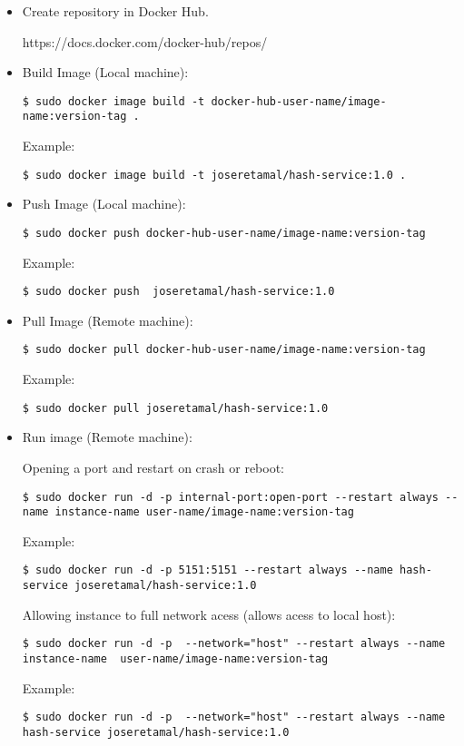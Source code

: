 \begin{itemize}
\item  Create repository in Docker Hub.

https://docs.docker.com/docker-hub/repos/
\item  Build Image (Local machine):
	
\begin{verbatim}
$ sudo docker image build -t docker-hub-user-name/image-name:version-tag .  
\end{verbatim}
Example:
\begin{verbatim}
$ sudo docker image build -t joseretamal/hash-service:1.0 . 
\end{verbatim}

\item  Push Image (Local machine):

\begin{verbatim}
$ sudo docker push docker-hub-user-name/image-name:version-tag
\end{verbatim}

Example:
\begin{verbatim}
$ sudo docker push  joseretamal/hash-service:1.0  
\end{verbatim}

\item  Pull Image (Remote machine):

\begin{verbatim}
$ sudo docker pull docker-hub-user-name/image-name:version-tag  
\end{verbatim}

Example:
\begin{verbatim}
$ sudo docker pull joseretamal/hash-service:1.0  
\end{verbatim}

\item  Run image (Remote machine):

\subitem Opening a port and restart on crash or reboot:
\begin{verbatim}
$ sudo docker run -d -p internal-port:open-port --restart always --name instance-name user-name/image-name:version-tag  
\end{verbatim}
Example:
\begin{verbatim}
$ sudo docker run -d -p 5151:5151 --restart always --name hash-service joseretamal/hash-service:1.0  
\end{verbatim}

\subitem Allowing instance to full network acess (allows acess to local host):
\begin{verbatim}
$ sudo docker run -d -p  --network="host" --restart always --name instance-name  user-name/image-name:version-tag 
\end{verbatim}
Example:
\begin{verbatim}
$ sudo docker run -d -p  --network="host" --restart always --name hash-service joseretamal/hash-service:1.0 
\end{verbatim}


\end{itemize}
